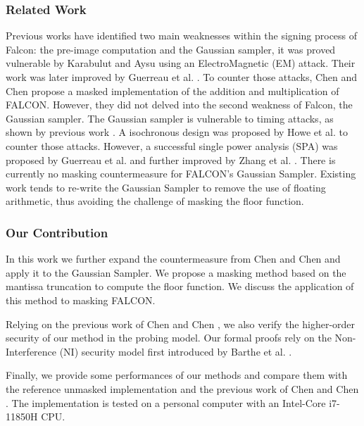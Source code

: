 \documentclass[runningheads]{llncs}
\begin{document}
\subsubsection{Related Work} Previous works have identified two main weaknesses within the signing process of Falcon: the pre-image computation and the Gaussian sampler, it was proved vulnerable by Karabulut and Aysu \cite{9586131} using an ElectroMagnetic (EM) attack. Their work was later improved by Guerreau et al. \cite{Guerreau_Martinelli_Ricosset_Rossi_2022}. To counter those attacks, Chen and Chen \cite{Chen_Chen_2024} propose a masked implementation of the addition and multiplication of FALCON. However, they did not delved into the second weakness of Falcon, the Gaussian sampler.\newline
The Gaussian sampler is vulnerable to timing attacks, as shown by previous work \cite{10.1007/978-3-662-53140-2_16,10.1145/3133956.3134028,cryptoeprint:2019/478,10.1145/3133956.3134023}. A
isochronous design was proposed by Howe et
al. \cite{10.1007/978-3-030-44223-1_4} to counter those attacks. However, a successful single
power analysis (SPA) was proposed by Guerreau et
al. \cite{Guerreau_Martinelli_Ricosset_Rossi_2022} and further
improved by Zhang et al. \cite{10.1007/978-3-031-30634-1_19}. There is
currently no masking countermeasure for FALCON's Gaussian
Sampler. Existing work \cite{10.1007/978-3-031-07082-2_9} tends to
re-write the Gaussian Sampler to remove the use of floating
arithmetic, thus avoiding the challenge of masking the floor function.
%
\subsubsection{Our Contribution}
In this work we further expand the countermeasure from Chen and Chen \cite{Chen_Chen_2024} and apply it to the Gaussian Sampler. We propose a masking method based on the mantissa truncation to compute the floor function. We discuss the application of this method to masking FALCON.

\medskip

Relying on the previous work of Chen and Chen \cite{Chen_Chen_2024}, we also verify the higher-order security of our method in the probing model. Our formal proofs rely on the Non-Interference (NI) security model first introduced by Barthe et al. \cite{barthe2016strong}.

\medskip

Finally, we provide some performances of our methods and compare them with the reference unmasked implementation and the previous work of Chen and Chen \cite{Chen_Chen_2024}. The implementation is tested on a personal computer with an Intel-Core i7-11850H CPU.
%
\end{document}
